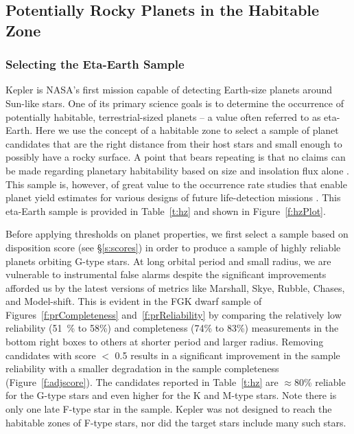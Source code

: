 \label{s:hz}
\subsection{Potentially Rocky Planets in the Habitable Zone}

\subsubsection{Selecting the Eta-Earth Sample}
Kepler is NASA's first mission capable of detecting Earth-size planets around Sun-like stars.  One of its primary science goals is to determine the occurrence of potentially habitable, terrestrial-sized planets -- a value often referred to as eta-Earth.  Here we use the concept of a habitable zone to select a sample of planet candidates that are the right distance from their host stars and small enough to possibly have a rocky surface. A point that bears repeating is that no claims can be made regarding planetary habitability based on size and insolation flux alone \citep{Kane2012,Tasker2017}.   This sample is, however, of great value to the occurrence rate studies that enable planet yield estimates for various designs of future life-detection missions \citep{stark2015}. This eta-Earth sample is provided in Table~\ref{t:hz} and shown in Figure~\ref{f:hzPlot}.


Before applying thresholds on planet properties, we first select a sample based on disposition score (see \S\ref{s:scores}) in order to produce a sample of highly reliable planets orbiting G-type stars. At long orbital period and small radius, we are vulnerable to instrumental false alarms despite the significant improvements afforded us by the latest versions of metrics like Marshall, Skye, Rubble, Chases, and Model-shift. This is evident in the FGK dwarf sample of Figures~\ref{f:prCompleteness} and~\ref{f:prReliability} by comparing the relatively low reliability (51~\% to 58\%) and completeness (74\% to 83\%) measurements in the bottom right boxes to others at shorter period and larger radius.  Removing candidates with score $<$ 0.5 results in a significant improvement in the sample reliability with a smaller degradation in the sample completeness (Figure~\ref{f:adjscore}).  The candidates reported in Table~\ref{t:hz} are $\approx$80\% reliable for the G-type stars and even higher for the K and M-type stars. Note there is only one late F-type star in the sample.  Kepler was not designed to reach the habitable zones of F-type stars, nor did the target stars include many such stars.


